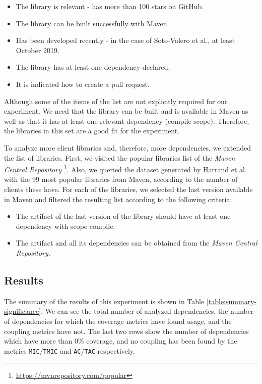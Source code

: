 \begin{itemize}
  \item The library is relevant - has more than 100 stars on GitHub.
  \item The library can be built successfully with Maven.
  \item Has been developed recently - in the case of Soto-Valero et al., at least October 2019.
  \item The library has at least one dependency declared.
  \item It is indicated how to create a pull request.
\end{itemize}

Although some of the items of the list are not explicitly required for our experiment. We need that the library can be built and is available in Maven as well as that it has at least one relevant dependency (compile scope). Therefore, the libraries in this set are a good fit for the experiment.

To analyze more client libraries and, therefore, more dependencies, we extended the list of libraries. First, we visited the popular libraries list of the \textit{Maven Central Repository} \footnote{\url{https://mvnrepository.com/popular}}. Also, we queried the dataset generated by Harrand et al. \cite{Harrand2019} with the 99 most popular libraries from Maven, according to the number of clients these have. For each of the libraries, we selected the last version available in Maven and filtered the resulting list according to the following criteria:

\begin{itemize}
  \item The artifact of the last version of the library should have at least one dependency with scope compile.
  \item The artifact and all its dependencies can be obtained from the \textit{Maven Central Repository}.
\end{itemize}


\subsection{Results}

The summary of the results of this experiment is shown in Table \ref{table:summary-significance}. We can see the total number of analyzed dependencies, the number of dependencies for which the coverage metrics have found usage, and the coupling metrics have not. The last two rows show the number of dependencies which have more than 0\% coverage, and no coupling has been found by the metrics \texttt{MIC}/\texttt{TMIC} and \texttt{AC}/\texttt{TAC} respectively.

